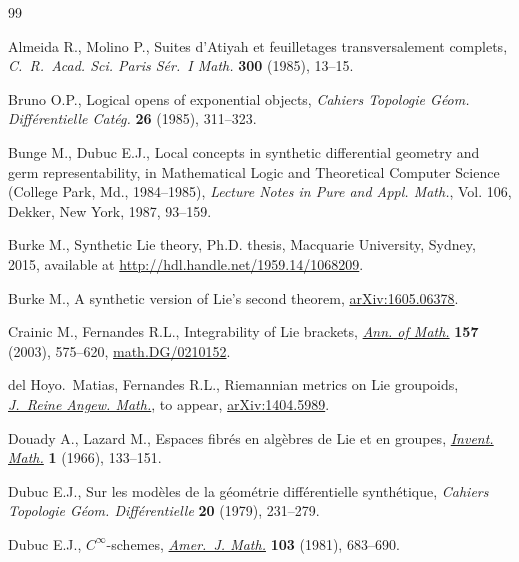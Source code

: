 \documentclass[pdftex]{sigma}
\numberwithin{equation}{section}
\begin{document}
\begin{thebibliography}{99}
\footnotesize\itemsep=0pt

Almeida R., Molino P., Suites d'{A}tiyah et feuilletages transversalement
 complets, \textit{C.~R.~Acad. Sci. Paris S\'er.~I Math.} \textbf{300} (1985),
 13--15.

Bruno O.P., Logical opens of exponential objects, \textit{Cahiers Topologie
 G\'eom. Diff\'erentielle Cat\'eg.} \textbf{26} (1985), 311--323.

Bunge M., Dubuc E.J., Local concepts in synthetic dif\/ferential geometry and
 germ representability, in Mathematical Logic and Theoretical Computer Science
 ({C}ollege {P}ark, {M}d., 1984--1985), \textit{Lecture Notes in Pure and
 Appl. Math.}, Vol. 106, Dekker, New York, 1987, 93--159.

Burke M., Synthetic {L}ie theory, Ph.D. thesis, Macquarie University, Sydney,
 2015, {a}vailable at \url{http://hdl.handle.net/1959.14/1068209}.

Burke M., A synthetic version of {L}ie's second theorem, \href{http://arxiv.org/abs/1605.06378}{arXiv:1605.06378}.

Crainic M., Fernandes R.L., Integrability of {L}ie brackets, \href{https://doi.org/10.4007/annals.2003.157.575}{\textit{Ann. of
 Math.}} \textbf{157} (2003), 575--620, \href{http://arxiv.org/abs/math.DG/0210152}{math.DG/0210152}.

del Hoyo.~Matias, Fernandes R.L., Riemannian metrics on {L}ie groupoids,
 \href{https://doi.org/10.1515/crelle-2015-0018}{\textit{J.~Reine Angew. Math.}}, {t}o appear, \href{http://arxiv.org/abs/1404.5989}{arXiv:1404.5989}.

Douady A., Lazard M., Espaces f\/ibr\'es en alg\`ebres de {L}ie et en groupes,
 \href{https://doi.org/10.1007/BF01389725}{\textit{Invent. Math.}} \textbf{1} (1966), 133--151.

Dubuc E.J., Sur les mod\`eles de la g\'eom\'etrie dif\/f\'erentielle
 synth\'etique, \textit{Cahiers Topologie G\'eom. Diff\'erentielle}
 \textbf{20} (1979), 231--279.

Dubuc E.J., {$C^{\infty }$}-schemes, \href{https://doi.org/10.2307/2374046}{\textit{Amer.~J. Math.}} \textbf{103}
 (1981), 683--690.


\end{thebibliography}
\end{document}
